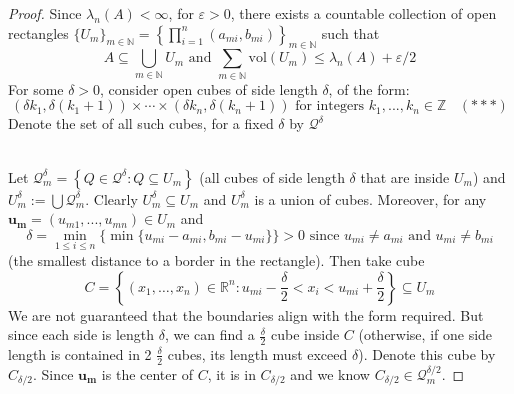 \documentclass{article}
\theoremstyle{plain}
\theoremstyle{definition}
\theoremstyle{remark}
\begin{document}
\begin{proof}
    Since $\lambda_n(A) < \infty$, for $\varepsilon>0$, there exists a countable collection of open rectangles $\{U_m\}_{m\in \mathbb{N}} = \left \{\prod \limits _{i=1}^n (a_{mi}, b_{mi})\right \}_{m\in \mathbb{N}}$ such that 
    \[A \subseteq \bigcup \limits _{m \in \mathbb{N}} U_m \text{ and } \sum \limits _{m\in \mathbb{N}} \text{vol}(U_m) \le \lambda_n(A) + \varepsilon/2\]
   For some $\delta >0$, consider open cubes of side length $\delta $, of the form:
        \[(\delta k_1, \delta (k_1+1)) \times \cdots \times (\delta k_n, \delta (k_n+1)) \text{ for integers }k_1, ..., k_n\in \mathbb{Z} \ \ \ \ (***)\]
    Denote the set of all such cubes, for a fixed $\delta$ by $\mathcal{Q}^\delta $


\begin{center}

\end{center} ~\\
        Let $\mathcal{Q}_m ^\delta  = \left \{Q \in \mathcal{Q}^\delta : Q \subseteq U_m\right \}$ (all cubes of side length $\delta$ that are inside $U_m$) and $U_m ^\delta := \bigcup \mathcal{Q}_m^\delta$. Clearly $U_m^\delta \subseteq U_m$ and $U_m^\delta$ is a union of cubes. Moreover, for any $\mathbf{u_m} =(u_{m1}, ..., u_{mn}) \in U_m$ and
        \[ \delta = \min_{1\le i\le n} \{ \min \{u_{mi} - a_{mi}, b_{mi} - u_{mi}\}\} > 0 \text{  since } u_{mi} \ne a_{mi} \text{ and } u_{mi}\ne b_{mi}\]
        (the smallest distance to a border in the rectangle). Then take cube 
        \[C = \left \{(x_1,\dots, x_n) \in \mathbb{R}^n:u_{mi} - \frac{\delta }{2} <x_i<u_{mi} +\frac{\delta}{2}\right \} \subseteq U_m \]
        We are not guaranteed that the boundaries align with the form required. But since each side is length $\delta$, we can find a $\frac{\delta}{2}$ cube inside $C$ (otherwise, if one side length is contained in 2 $\frac{\delta}{2}$ cubes, its length must exceed $\delta$). Denote this cube by $C_{\delta /2}$. Since $\mathbf{u_m}$ is the center of $C$, it is in $C_{\delta/2}$ and we know $C_{\delta/2 } \in \mathcal{Q}_m^{\delta/2}$.


\end{proof}
\end{document}
